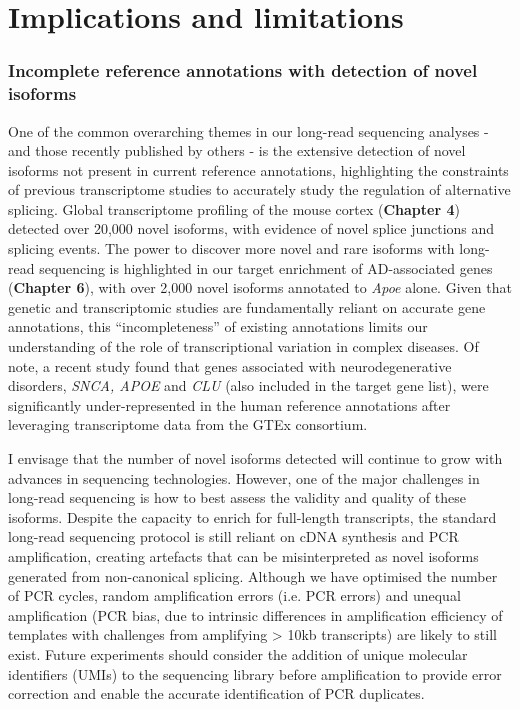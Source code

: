 \section{Implications and limitations}

\subsubsection{Incomplete reference annotations with detection of novel isoforms} 
\label{ch7: artefacts}
One of the common overarching themes in our long-read sequencing analyses - and those recently published by others - is the extensive detection of novel isoforms not present in current reference annotations, highlighting the constraints of previous transcriptome studies to accurately study the regulation of alternative splicing. Global transcriptome profiling of the mouse cortex (\textbf{Chapter 4}) detected over 20,000 novel isoforms, with evidence of novel splice junctions and splicing events. The power to discover more novel and rare isoforms with long-read sequencing is highlighted in our target enrichment of AD-associated genes (\textbf{Chapter 6}), with over 2,000 novel isoforms annotated to \textit{Apoe} alone. Given that genetic and transcriptomic studies are fundamentally reliant on accurate gene annotations, this “incompleteness” of existing annotations limits our understanding of the role of transcriptional variation in complex diseases. Of note, a recent study found that genes associated with neurodegenerative disorders, \textit{SNCA, APOE} and \textit{CLU} (also included in the target gene list), were significantly under-represented in the human reference annotations after leveraging transcriptome data from the GTEx consortium\cite{Zhang2020b}.  

I envisage that the number of novel isoforms detected will continue to grow with advances in sequencing technologies. However, one of the major challenges in long-read sequencing is how to best assess the validity and quality of these isoforms. Despite the capacity to enrich for full-length transcripts, the standard long-read sequencing protocol is still reliant on cDNA synthesis and PCR amplification, creating artefacts that can be misinterpreted as novel isoforms generated from non-canonical splicing. Although we have optimised the number of PCR cycles, random amplification errors (i.e. PCR errors) and unequal amplification (PCR bias, due to intrinsic differences in amplification efficiency of templates with challenges from amplifying > 10kb transcripts) are likely to still exist. Future experiments should consider the addition of unique molecular identifiers (UMIs) to the sequencing library before amplification to provide error correction and enable the accurate identification of PCR duplicates\cite{Fu2018}.  

